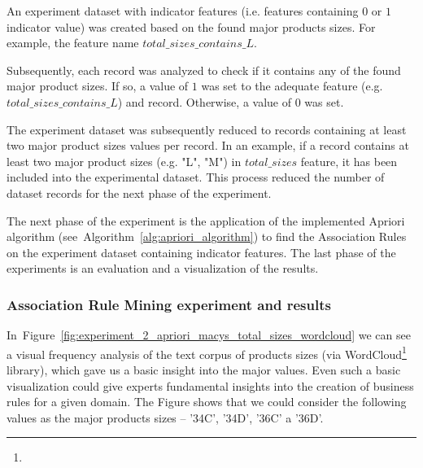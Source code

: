     			An experiment dataset with indicator features (i.e. features containing $0$ or $1$ indicator value) was created based on the found major products sizes. For example, the feature name $total\_sizes\_contains\_L$.
    			
    			Subsequently, each record was analyzed to check if it contains any of the found major product sizes. If so, a value of $1$ was set to the adequate feature (e.g. $total\_sizes\_contains\_L$) and record. Otherwise, a value of $0$ was set.
    			
    			The experiment dataset was subsequently reduced to records containing at least two major product sizes values per record. In an example, if a record contains at least two major product sizes (e.g. "L", "M") in $total\_sizes$ feature, it has been included into the experimental dataset. This process reduced the number of dataset records for the next phase of the experiment.
    			
    			The next phase of the experiment is the application of the implemented Apriori algorithm (see~Algorithm~\ref{alg:apriori_algorithm}) to find the Association Rules on the experiment dataset containing indicator features. The last phase of the experiments is an evaluation and a visualization of the results.
    		
				\subsubsection{Association Rule Mining experiment and results}   
				 
				 	In~Figure~\ref{fig:experiment_2_apriori_macys_total_sizes_wordcloud} we can see a visual frequency analysis of the text corpus of products sizes (via WordCloud\footnote{} library), which gave us a basic insight into the major values. Even such a basic visualization could give experts fundamental insights into the creation of business rules for a given domain. The Figure shows that we could consider the following values as the major products sizes -- '34C', '34D', '36C' a '36D'.
				 	

